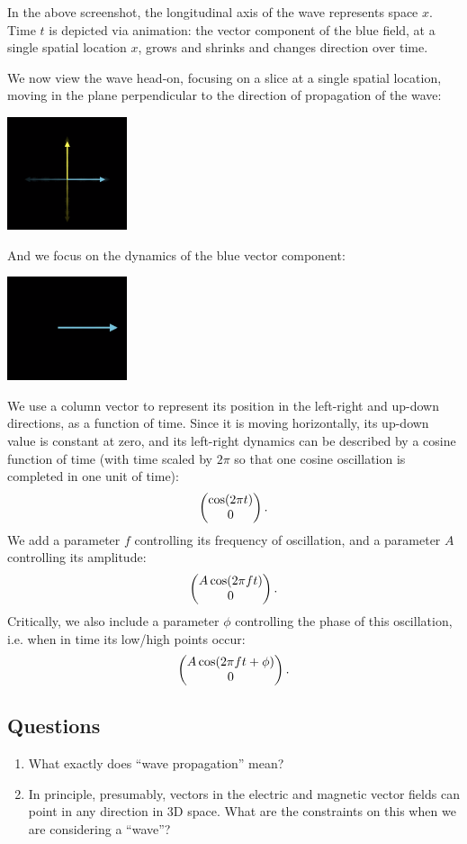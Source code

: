 In the above screenshot, the longitudinal axis of the wave represents space $x$. Time $t$ is
depicted via animation: the vector component of the blue field, at a single spatial location $x$,
grows and shrinks and changes direction over time.

We now view the wave head-on, focusing on a slice at a single spatial location, moving in the plane
perpendicular to the direction of propagation of the wave:

\includegraphics[width=100pt]{img/quantum-waves-2.png}

And we focus on the dynamics of the blue vector component:

\includegraphics[width=100pt]{img/quantum-waves-3.png}

We use a column vector to represent its position in the left-right and up-down directions, as a
function of time. Since it is moving horizontally, its up-down value is constant at zero, and its
left-right dynamics can be described by a cosine function of time (with time scaled by $2\pi$ so
that one cosine oscillation is completed in one unit of time):
\begin{align*}
  \begin{pmatrix}\cos(2\pi t)\\0\end{pmatrix}.
\end{align*}
We add a parameter $f$ controlling its frequency of oscillation, and a parameter $A$ controlling its
amplitude:
\begin{align*}
  \begin{pmatrix}A\cos(2\pi ft)\\0\end{pmatrix}.
\end{align*}
Critically, we also include a parameter $\phi$ controlling the phase of this oscillation, i.e. when
in time its low/high points occur:
\begin{align*}
  \begin{pmatrix}A\cos(2\pi ft + \phi)\\0\end{pmatrix}.
\end{align*}

\subsection*{Questions}
\begin{enumerate}
\item What exactly does ``wave propagation'' mean?
\item In principle, presumably, vectors in the electric and magnetic vector fields can point in any
  direction in 3D space. What are the constraints on this when we are considering a ``wave''?
\end{enumerate}

